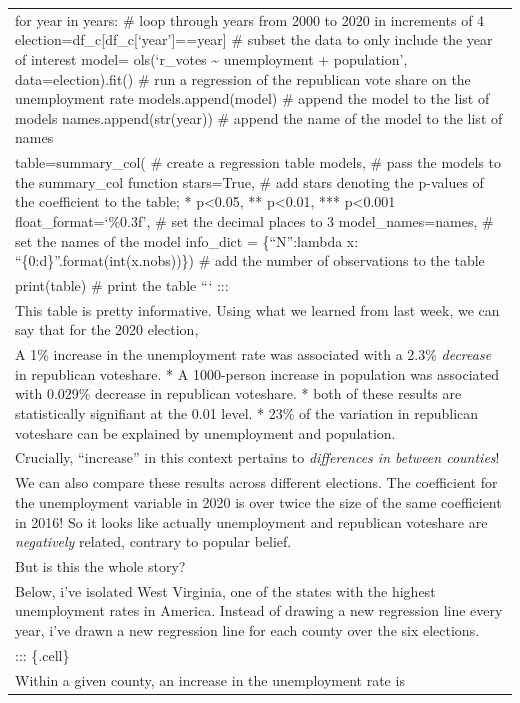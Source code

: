 \documentclass[
  letterpaper,
  DIV=11,
  numbers=noendperiod]{scrreprt}
\begin{document}
\begin{longtable}[]{@{}
  >{\raggedright\arraybackslash}p{}@{}}
for year in years: \# loop through years from 2000 to 2020 in increments
of 4 election=df\_c{[}df\_c{[}`year'{]}==year{]} \# subset the data to
only include the year of interest model= ols(`r\_votes \textasciitilde{}
unemployment + population', data=election).fit() \# run a regression of
the republican vote share on the unemployment rate models.append(model)
\# append the model to the list of models names.append(str(year)) \#
append the name of the model to the list of names \\
table=summary\_col( \# create a regression table models, \# pass the
models to the summary\_col function stars=True, \# add stars denoting
the p-values of the coefficient to the table; * p\textless0.05, **
p\textless0.01, *** p\textless0.001 float\_format=`\%0.3f', \# set the
decimal places to 3 model\_names=names, \# set the names of the model
info\_dict = \{``N'':lambda x: ``\{0:d\}''.format(int(x.nobs))\}) \# add
the number of observations to the table \\
print(table) \# print the table ``` ::: \\
This table is pretty informative. Using what we learned from last week,
we can say that for the 2020 election, \\
* A 1\% increase in the unemployment rate was associated with a 2.3\%
\emph{decrease} in republican voteshare. * A 1000-person increase in
population was associated with 0.029\% decrease in republican voteshare.
* both of these results are statistically signifiant at the 0.01 level.
* 23\% of the variation in republican voteshare can be explained by
unemployment and population. \\
Crucially, ``increase'' in this context pertains to \emph{differences in
between counties}! \\
We can also compare these results across different elections. The
coefficient for the unemployment variable in 2020 is over twice the size
of the same coefficient in 2016! So it looks like actually unemployment
and republican voteshare are \emph{negatively} related, contrary to
popular belief. \\
But is this the whole story? \\
Below, i've isolated West Virginia, one of the states with the highest
unemployment rates in America. Instead of drawing a new regression line
every year, i've drawn a new regression line for each county over the
six elections. \\
::: \{.cell\} \\
Within a given county, an increase in the unemployment rate is

\end{longtable}
\end{document}
